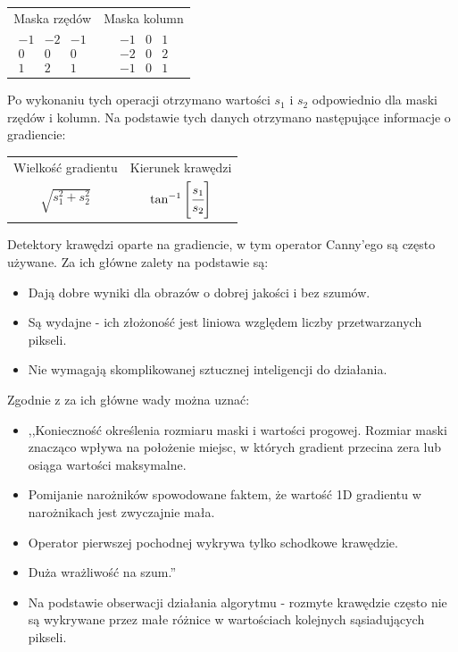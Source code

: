 \documentclass[a4paper,11pt,twoside]{report}
\theoremstyle{definition}
\begin{document}
\begin{table}[h!]
\centering
\begin{tabular} { c c }
  Maska rzędów & Maska kolumn \\ 
$
\begin{matrix}
-1 & -2 & -1 \\
0 & 0 & 0 \\
1 & 2 & 1
\end{matrix}$
&
$\begin{matrix}
-1 & 0 & 1 \\
-2 & 0 & 2 \\
-1 & 0 & 1
\end{matrix}$
\end{tabular}
\end{table}

Po wykonaniu tych operacji otrzymano wartości $s_1$ i $s_2$ odpowiednio dla maski rzędów i kolumn. Na podstawie tych danych otrzymano następujące informacje o gradiencie:
\begin{table}[h!]
\centering
\begin{tabular} { c c }
  Wielkość gradientu & Kierunek krawędzi \\ 
$\sqrt{s_1^2 + s_2^2}$ & $\tan^{-1} \Bigg[ {\cfrac{s_1}{s_2}} \Bigg]$
\end{tabular}
\end{table}

Detektory krawędzi oparte na gradiencie, w tym operator Canny'ego są często używane. Za ich główne zalety na podstawie \cite{Cyfrowe przetwarzanie obrazów medycznych} są:
\begin{itemize}[noitemsep]
\item Dają dobre wyniki dla obrazów o dobrej jakości i bez szumów.
\item Są wydajne - ich złożoność jest liniowa względem liczby przetwarzanych pikseli.
\item Nie wymagają skomplikowanej sztucznej inteligencji do działania.
\end{itemize}

Zgodnie z \cite{Cyfrowe przetwarzanie obrazów medycznych} za ich główne wady można uznać:
\begin{itemize}[noitemsep]
\item ,,Konieczność określenia rozmiaru maski i wartości progowej. Rozmiar maski znacząco wpływa na położenie miejsc, w których gradient przecina zera lub osiąga wartości maksymalne.
\item Pomijanie narożników spowodowane faktem, że wartość 1D gradientu w narożnikach jest zwyczajnie mała.
\item Operator pierwszej pochodnej wykrywa tylko schodkowe krawędzie.
\item Duża wrażliwość na szum.''
\item Na podstawie obserwacji działania algorytmu - rozmyte krawędzie często nie są wykrywane przez małe różnice w wartościach kolejnych sąsiadujących pikseli.
\end{itemize}
\end{document}
